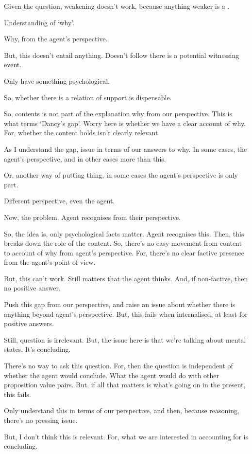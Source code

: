\begin{note}
  Given the question, weakening doesn't work, because anything weaker is a \requ{}.
\end{note}

\begin{note}
  Understanding of `why'.

  Why, from the agent's perspective.

  But, this doesn't entail anything.
  Doesn't follow there is a potential witnessing event.

  Only have something psychological.

  So, whether there is a relation of support is dispensable.

  So, contents is not part of the explanation why from our perspective.
  This is what \citeauthor{Hieronymi:2011aa} terms `Dancy's gap'.
  Worry here is whether we have a clear account of why.
  For, whether the content holds isn't clearly relevant.

  As I understand the gap, issue in terms of our answers to why.
  In some cases, the agent's perspective, and in other cases more than this.

  Or, another way of putting thing, in some cases the agent's perspective is only part.

  Different perspective, even the agent.

  Now, the problem.
  Agent recognises from their perspective.

  So, the idea is, only psychological facts matter.
  Agent recognises this.
  Then, this breaks down the role of the content.
  So, there's no easy movement from content to account of why from agent's perspective.
  For, there's no clear factive presence from the agent's point of view.

  But, this can't work.
  Still matters that the agent thinks.
  And, if non-factive, then no positive answer.

  Push this gap from our perspective, and raise an issue about whether there is anything beyond agent's perspective.
  But, this fails when internalised, at least for positive answers.

  Still, question is irrelevant.
  But, the issue here is that we're talking about mental states.
  It's concluding.

  There's no way to ask this question.
  For, then the question is independent of whether the agent would conclude.
  What the agent would do with other proposition value pairs.
  But, if all that matters is what's going on in the present, this fails.

  Only understand this in terms of our perspective, and then, because reasoning, there's no pressing issue.

  But, I don't think this is relevant.
  For, what we are interested in accounting for is concluding.
\end{note}

